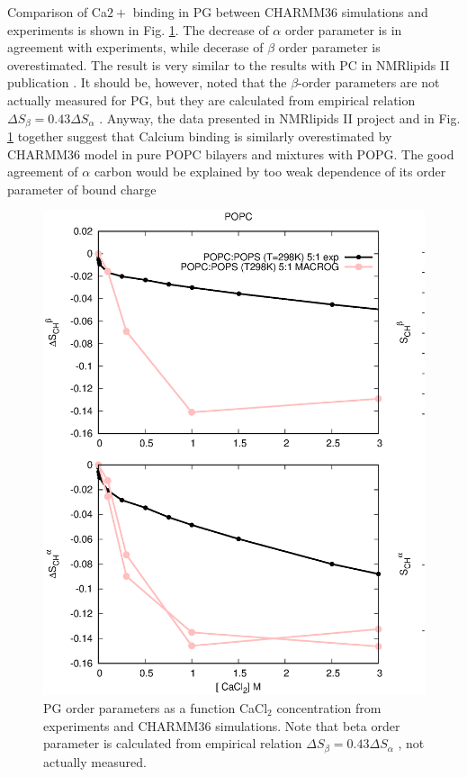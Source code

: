 \documentclass[aps,prl,superscriptaddress,twocolumn]{revtex4}
\begin{document}
Comparison of Ca$2+$ binding in PG between CHARMM36 simulations and experiments \cite{borle85}
is shown in Fig. \ref{changesWITHCaClPG}. The decrease of $\alpha$ order parameter
is in agreement with experiments, while decerase of $\beta$ order parameter is overestimated.
The result is very similar to the results with PC in NMRlipids II publication \cite{catte16}.
It should be, however, noted that the $\beta$-order parameters are not actually measured for PG,
but they are calculated from empirical relation $\Delta S_{\beta}=0.43\Delta S_{\alpha}$ \cite{akutsu81}.
Anyway, the data presented in NMRlipids II project and in Fig. \ref{changesWITHCaClPG} together
suggest that Calcium binding is similarly overestimated by CHARMM36 model in pure POPC bilayers and mixtures with
POPG. The good agreement of $\alpha$ carbon would be explained by too weak dependence of its order
parameter of bound charge
\begin{figure}[]
  \centering
  \includegraphics[width=18cm]{../Figs/CHANGESwithCaClPS.eps}
  \caption{\label{changesWITHCaClPG}
    PG order parameters as a function CaCl$_2$ concentration from experiments \cite{borle85} and CHARMM36 simulations.
    Note that beta order parameter is calculated from empirical relation $\Delta S_{\beta}=0.43\Delta S_{\alpha}$ \cite{akutsu81}, not actually measured. 
  }
\end{figure}
\end{document}

